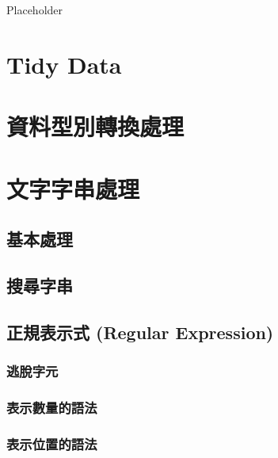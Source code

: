 \documentclass[]{book}
\begin{document}
Placeholder

\hypertarget{tidy-data}{%
\section{Tidy Data}\label{tidy-data}}

\hypertarget{ux8cc7ux6599ux578bux5225ux8f49ux63dbux8655ux7406}{%
\section{資料型別轉換處理}\label{ux8cc7ux6599ux578bux5225ux8f49ux63dbux8655ux7406}}

\hypertarget{ux6587ux5b57ux5b57ux4e32ux8655ux7406}{%
\section{文字字串處理}\label{ux6587ux5b57ux5b57ux4e32ux8655ux7406}}

\hypertarget{ux57faux672cux8655ux7406}{%
\subsection{基本處理}\label{ux57faux672cux8655ux7406}}

\hypertarget{ux641cux5c0bux5b57ux4e32}{%
\subsection{搜尋字串}\label{ux641cux5c0bux5b57ux4e32}}

\hypertarget{ux6b63ux898fux8868ux793aux5f0f-regular-expression}{%
\subsection{正規表示式 (Regular Expression)}\label{ux6b63ux898fux8868ux793aux5f0f-regular-expression}}

\hypertarget{ux9003ux812bux5b57ux5143}{%
\subsubsection{逃脫字元}\label{ux9003ux812bux5b57ux5143}}

\hypertarget{ux8868ux793aux6578ux91cfux7684ux8a9eux6cd5}{%
\subsubsection{表示數量的語法}\label{ux8868ux793aux6578ux91cfux7684ux8a9eux6cd5}}

\hypertarget{ux8868ux793aux4f4dux7f6eux7684ux8a9eux6cd5}{%
\subsubsection{表示位置的語法}\label{ux8868ux793aux4f4dux7f6eux7684ux8a9eux6cd5}}
\end{document}
